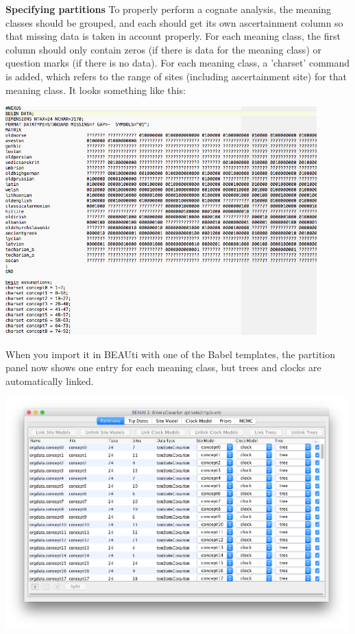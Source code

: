 \documentclass{article}
\begin{document}
{\bf Specifying partitions} To properly perform a cognate analysis, the meaning classes should be grouped, and each should get its own ascertainment column so that missing data is taken in account properly. For each meaning class, the first column should only contain zeros (if there is data for the meaning class) or question marks (if there is no data).
For each meaning class, a  'charset' command is added, which refers to the range of sites (including ascertainment site) for that meaning class. It looks something like this:

\begin{center}
\includegraphics[width=0.9\textwidth]{nexus2}
\end{center}

When you import it in BEAUti with one of the Babel templates, the partition panel now shows one entry for each meaning class, but trees and clocks are automatically linked.

\begin{center}
\includegraphics[width=0.99\textwidth]{partitionpanel}
\end{center}
\end{document}
